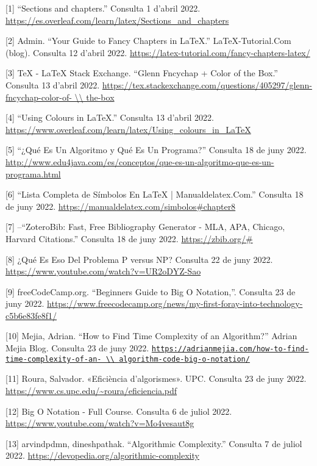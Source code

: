 [1] “Sections and chapters.” Consulta 1 d’abril 2022. \url{https://es.overleaf.com/learn/latex/Sections_and_chapters}

[2] Admin. “Your Guide to Fancy Chapters in LaTeX.” LaTeX-Tutorial.Com (blog). Consulta 12 d’abril 2022. \url{https://latex-tutorial.com/fancy-chapters-latex/}

[3] TeX - LaTeX Stack Exchange. “Glenn Fncychap + Color of the Box.” Consulta 13 d’abril 2022. \url{https://tex.stackexchange.com/questions/405297/glenn-fncychap-color-of- \\ the-box} 

[4] “Using Colours in LaTeX.” Consulta 13 d’abril 2022. \url{https://www.overleaf.com/learn/latex/Using_colours_in_LaTeX}

[5] “¿Qué Es Un Algoritmo y Qué Es Un Programa?” Consulta 18 de juny 2022. \url{http://www.edu4java.com/es/conceptos/que-es-un-algoritmo-que-es-un-programa.html}

[6] “Lista Completa de Símbolos En LaTeX | Manualdelatex.Com.” Consulta 18 de juny 2022. \url{https://manualdelatex.com/simbolos#chapter8}

[7] --“ZoteroBib: Fast, Free Bibliography Generator - MLA, APA, Chicago, Harvard Citations.” Consulta 18 de juny 2022.   \url{https://zbib.org/#}

[8] ¿Qué Es Eso Del Problema P versus NP? Consulta 22 de juny 2022. \url{https://www.youtube.com/watch?v=UR2oDYZ-Sao}

[9] freeCodeCamp.org. “Beginners Guide to Big O Notation,”. Consulta 23 de juny 2022. \url{https://www.freecodecamp.org/news/my-first-foray-into-technology-c5b6e83fe8f1/}

[10] Mejia, Adrian. “How to Find Time Complexity of an Algorithm?” Adrian Mejia Blog. Consulta 23 de juny 2022. \href{https://adrianmejia.com/how-to-find-time-complexity-of-an-algorithm-code-big-o-notation/}{\nolinkurl{https://adrianmejia.com/how-to-find-time-complexity-of-an- \\ algorithm-code-big-o-notation/}}

[11] Roura, Salvador. «Eficiència d’algorismes». UPC. Consulta 23 de juny 2022. \url{https://www.cs.upc.edu/~roura/eficiencia.pdf}

[12] Big O Notation - Full Course. Consulta 6 de juliol 2022. \url{https://www.youtube.com/watch?v=Mo4vesaut8g}

[13] arvindpdmn, dineshpathak. “Algorithmic Complexity.” Consulta 7 de juliol 2022. \url{https://devopedia.org/algorithmic-complexity}

